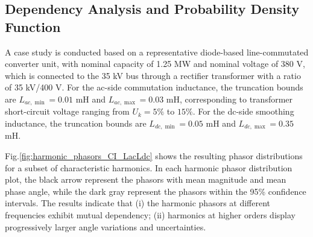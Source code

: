 \subsection{Dependency Analysis and Probability Density Function}
A case study is conducted based on a representative diode-based line-commutated converter unit, with nominal capacity of 1.25 MW and nominal voltage of 380 V, which is connected to the 35 kV bus through a rectifier transformer with a ratio of 35 kV/400 V. 
For the ac-side commutation inductance, the truncation bounds are $L_{ac,\min} = 0.01$ mH and $L_{ac,\max} = 0.03$ mH, corresponding to transformer short-circuit voltage ranging from $U_k = 5\%$ to $15\%$. For the dc-side smoothing inductance, the truncation bounds are $L_{dc,\min} = 0.05$ mH and $L_{dc,\max} = 0.35$ mH.

Fig.\ref{fig:harmonic_phasors_CI_LacLdc} shows the resulting phasor distributions for a subset of characteristic harmonics. In each harmonic phasor distribution plot, the black arrow represent the phasors with mean magnitude and mean phase angle, while the dark gray represent the phasors within the 95\% confidence intervals. The results indicate that (i) the harmonic phasors at different frequencies exhibit mutual dependency; (ii) harmonics at higher orders display progressively larger angle variations and uncertainties. 

